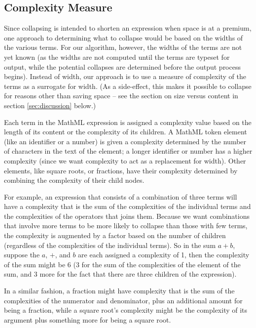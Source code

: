 \documentclass{llncs}
\begin{document}
\subsection{Complexity Measure}
\label{sec:complexity}

Since collapsing is intended to shorten an expression when space is at
a premium, one approach to determining what to collapse would be
based on the widths of the various terms.  For our algorithm,
however, the widths of the terms are not yet known (as the widths are
not computed until the terms are typeset for output, while the potential
collapses are determined before the output process begins).  Instead
of width, our approach is to use a measure of complexity of the terms
as a surrogate for width.  (As a side-effect, this makes it possible
to collapse for reasons other than saving space -- see the section on
size versus content in section \ref{sec:discussion} below.)

Each term in the MathML expression is assigned a complexity value
based on the length of its content or the complexity of its children.
A MathML token element (like an identifier or a number) is given a
complexity determined by the number of characters in the text of
the element; a longer identifier or number has a higher complexity
(since we want complexity to act as a replacement for width).  Other
elements, like square roots, or fractions, have their complexity
determined by combining the complexity of their child nodes.

For example, an expression that consists of a combination of three
terms will have a complexity that is the sum of the complexities of
the individual terms and the complexities of the operators that joins
them.  Because we want combinations that involve more terms to be more
likely to collapse than those with few terms, the complexity is
augmented by a factor based on the number of children (regardless of
the complexities of the individual terms).  So in the sum $a+b$,
suppose the $a$, $+$, and $b$ are each assigned a complexity of 1,
then the complexity of the sum might be 6 (3 for the sum of the
complexities of the element of the sum, and 3 more for the fact that
there are three children of the expression).

In a similar fashion, a fraction might have complexity that is the
sum of the complexities of the numerator and denominator, plus an
additional amount for being a fraction, while a square root's
complexity might be the complexity of its argument plus something
more for being a square root.
\end{document}
